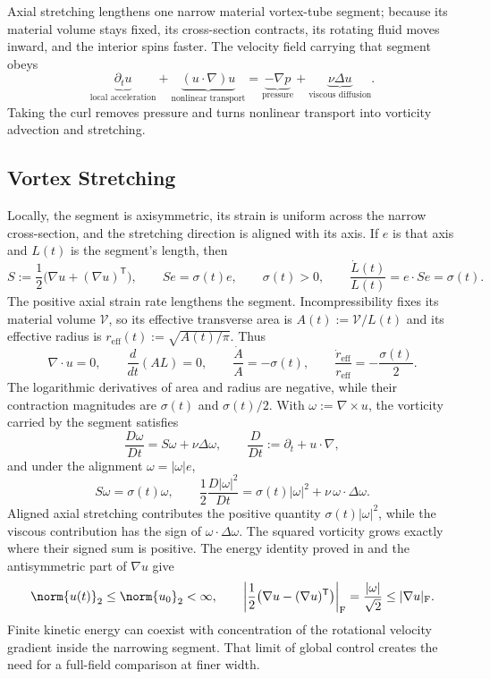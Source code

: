 
Axial stretching lengthens one narrow material vortex-tube segment; because its material volume stays fixed, its cross-section contracts, its rotating fluid moves inward, and the interior spins faster. The velocity field carrying that segment obeys
\[
  \underbrace{\partial_t u}_{\text{local acceleration}}
  +
  \underbrace{(u\cdot\nabla)u}_{\text{nonlinear transport}}
  =
  \underbrace{-\nabla p}_{\text{pressure}}
  +
  \underbrace{\nu\Delta u}_{\text{viscous diffusion}}.
\]
Taking the curl removes pressure and turns nonlinear transport into vorticity advection and stretching.

\subsection{Vortex Stretching}\label{sub:ThePerfectlyStretchingVortex}

Locally, the segment is axisymmetric, its strain is uniform across the narrow cross-section, and the stretching direction is aligned with its axis. If \(e\) is that axis and \(L(t)\) is the segment's length, then
\[
  S:=\frac12\bigl(\nabla u+(\nabla u)^{\mathsf T}\bigr),
  \qquad
  Se=\sigma(t)e,
  \qquad
  \sigma(t)>0,
  \qquad
  \frac{\dot L(t)}{L(t)}
  =
  e\cdot Se
  =
  \sigma(t).
\]
The positive axial strain rate lengthens the segment. Incompressibility fixes its material volume \(\mathcal V\), so its effective transverse area is \(A(t):=\mathcal V/L(t)\) and its effective radius is \(r_{\mathrm{eff}}(t):=\sqrt{A(t)/\pi}\). Thus
\[
  \nabla\cdot u=0,
  \qquad
  \frac{d}{dt}(A L)=0,
  \qquad
  \frac{\dot A}{A}=-\sigma(t),
  \qquad
  \frac{\dot r_{\mathrm{eff}}}{r_{\mathrm{eff}}}
  =
  -\frac{\sigma(t)}{2}.
\]
The logarithmic derivatives of area and radius are negative, while their contraction magnitudes are \(\sigma(t)\) and \(\sigma(t)/2\). With \(\omega:=\nabla\times u\), the vorticity carried by the segment satisfies
\[
  \frac{D\omega}{Dt}
  =
  S\omega+\nu\Delta\omega,
  \qquad
  \frac{D}{Dt}
  :=
  \partial_t+u\cdot\nabla,
\]
and under the alignment \(\omega=|\omega|e\),
\[
  S\omega
  =
  \sigma(t)\omega,
  \qquad
  \frac12\frac{D|\omega|^2}{Dt}
  =
  \sigma(t)|\omega|^2
  +
  \nu\,\omega\cdot\Delta\omega.
\]
Aligned axial stretching contributes the positive quantity \(\sigma(t)|\omega|^2\), while the viscous contribution has the sign of \(\omega\cdot\Delta\omega\). The squared vorticity grows exactly where their signed sum is positive. The energy identity proved in  and the antisymmetric part of \(\nabla u\) give
\[
  \norm{u(t)}_2
  \leq
  \norm{u_0}_2
  <\infty,
  \qquad
  \left|\frac12\bigl(\nabla u-(\nabla u)^{\mathsf T}\bigr)\right|_{\mathrm F}
  =
  \frac{|\omega|}{\sqrt2}
  \leq
  |\nabla u|_{\mathrm F}.
\]
Finite kinetic energy can coexist with concentration of the rotational velocity gradient inside the narrowing segment. That limit of global control creates the need for a full-field comparison at finer width.

